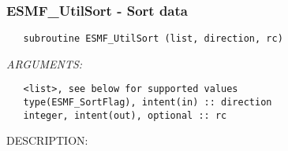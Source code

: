  
\setlength{\oldparskip}{\parskip}
\setlength{\parskip}{1.5ex}
\setlength{\oldparindent}{\parindent}
\setlength{\parindent}{0pt}
\setlength{\oldbaselineskip}{\baselineskip}
\setlength{\baselineskip}{11pt}
 
\def\bv{\begin{verbatim}}
\def\ev{\end{verbatim}}
\def\be{\begin{equation}}
\def\ee{\end{equation}}
\def\bea{\begin{eqnarray}}
\def\eea{\end{eqnarray}}
\def\bi{\begin{itemize}}
\def\ei{\end{itemize}}
\def\bn{\begin{enumerate}}
\def\en{\end{enumerate}}
\def\bd{\begin{description}}
\def\ed{\end{description}}
\def\({\left (}
\def\){\right )}
\def\[{\left [}
\def\]{\right ]}
\def\<{\left  \langle}
\def\>{\right \rangle}
\def\cI{{\cal I}}
\def\diag{\mathop{\rm diag}}
\def\tr{\mathop{\rm tr}}


 
\subsubsection [ESMF\_UtilSort] {ESMF\_UtilSort - Sort data }


   
\begin{verbatim}   subroutine ESMF_UtilSort (list, direction, rc) 
   \end{verbatim}{\em ARGUMENTS:}
\begin{verbatim}   <list>, see below for supported values 
   type(ESMF_SortFlag), intent(in) :: direction 
   integer, intent(out), optional :: rc 
   \end{verbatim}
{\sf DESCRIPTION:\\ }

